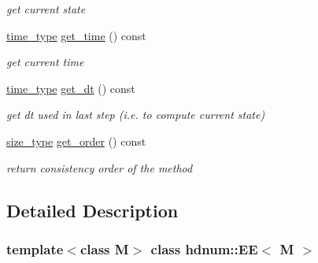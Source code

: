 \begin{DoxyCompactItemize}
\begin{DoxyCompactList}\small\item\em get current state \item\end{DoxyCompactList}\item 
\hypertarget{classhdnum_1_1EE_a7c7ae19fc0aa93eac51497748f2101e2}{
\hyperlink{classhdnum_1_1EE_a812a3ec962aa0b2924e30830828bf306}{time\_\-type} \hyperlink{classhdnum_1_1EE_a7c7ae19fc0aa93eac51497748f2101e2}{get\_\-time} () const }
\label{classhdnum_1_1EE_a7c7ae19fc0aa93eac51497748f2101e2}

\begin{DoxyCompactList}\small\item\em get current time \item\end{DoxyCompactList}\item 
\hypertarget{classhdnum_1_1EE_a8aa4b8170705a377b04e3dd589c7d2d7}{
\hyperlink{classhdnum_1_1EE_a812a3ec962aa0b2924e30830828bf306}{time\_\-type} \hyperlink{classhdnum_1_1EE_a8aa4b8170705a377b04e3dd589c7d2d7}{get\_\-dt} () const }
\label{classhdnum_1_1EE_a8aa4b8170705a377b04e3dd589c7d2d7}

\begin{DoxyCompactList}\small\item\em get dt used in last step (i.e. to compute current state) \item\end{DoxyCompactList}\item 
\hypertarget{classhdnum_1_1EE_ab532f7b8db8f30ebac1712fcad3a2d0f}{
\hyperlink{classhdnum_1_1EE_a633508b18536c883d9fbbcccb7ac7ebc}{size\_\-type} \hyperlink{classhdnum_1_1EE_ab532f7b8db8f30ebac1712fcad3a2d0f}{get\_\-order} () const }
\label{classhdnum_1_1EE_ab532f7b8db8f30ebac1712fcad3a2d0f}

\begin{DoxyCompactList}\small\item\em return consistency order of the method \item\end{DoxyCompactList}\end{DoxyCompactItemize}


\subsection{Detailed Description}
\subsubsection*{template$<$class M$>$ class hdnum::EE$<$ M $>$}


